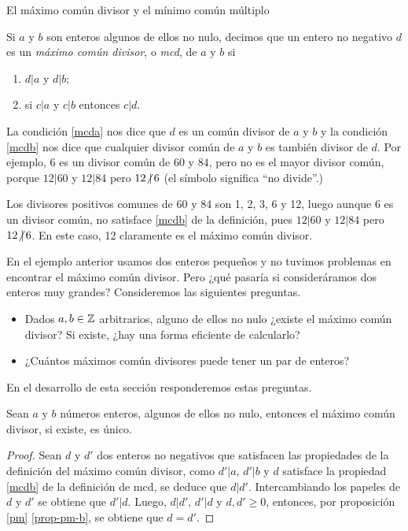 \begin{section}{El máximo común divisor y el mínimo común múltiplo}\label{seccion-maximo-comun-divisor-mcm}

\begin{definicion}\label{mcd} Si $a$ y $b$ son enteros algunos de ellos no nulo, decimos que un entero no negativo $d$ es un \textit{máximo común divisor}, o \textit{mcd}, de $a$ y $b$ si
\begin{enumerate}[label=\textit{\alph*)}]
\item\label{mcda} $ d|a$  y $d|b$;
\item\label{mcdb}  si $ c|a $ y $c|b$ entonces $ c|d$.
\end{enumerate}
\end{definicion}
La condición \ref{mcda} nos dice que $d$ es un común divisor de $a$ y $b$ y la condición \ref{mcdb} nos dice que cualquier divisor común de
$a$ y $b$ es también divisor de $d$. Por ejemplo, $6$ es un divisor común de $60$ y $84$, pero no es el mayor divisor común, porque
$12|60$ y $12|84$ pero $12{\operatorname{\not|\,} }6$ (el símbolo significa ``no divide''.)



\begin{ejemplo} \label{ejem-1-mcd}
    Los divisores positivos comunes de 60  y 84 son 1, 2, 3, 6 y 12, luego aunque 6  es un divisor común, no satisface \ref{mcdb} de la definición, pues $12|60$ y $12|84$ pero $12{\operatorname{\not|\,} }6$. En este caso, 12  claramente es  el  máximo común divisor.
\end{ejemplo}

En el ejemplo anterior usamos dos enteros pequeños y no tuvimos problemas en encontrar el  máximo común divisor. Pero ¿qué pasaría si consideráramos dos enteros muy grandes? Consideremos las siguientes preguntas.
\begin{itemize}
    \item Dados $a,b \in \mathbb Z$ arbitrarios, alguno de ellos no nulo ¿existe el máximo común divisor? Si existe, ¿hay una forma eficiente de calcularlo?
    \item  ¿Cuántos máximos común divisores puede tener un  par de enteros?
\end{itemize}
En  el desarrollo de esta sección responderemos estas preguntas. 


\begin{proposicion}\label{prop-mcd-unico}
    Sean $a$ y $b$ números enteros, algunos de ellos no nulo, entonces el máximo común divisor, si existe,  es único. 
\end{proposicion}
\begin{proof}
    Sean $d$ y $d'$ dos enteros no negativos que satisfacen las propiedades de la definición del máximo común divisor, como $d'|a$, $d'|b$ y  $d$ satisface la propiedad {\ref{mcdb}} de la definición de mcd, se deduce que $d|d'$. Intercambiando  los papeles de $d$ y $d'$ se obtiene que $d'|d$. Luego, $d|d'$, $d'|d$ y $d,d'\ge 0$, entonces, por  proposición \ref{pm} \ref{prop-pm-b}, se obtiene que $d=d'$.
\end{proof}


\end{section}
